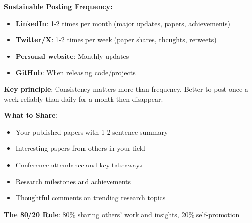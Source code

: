 \documentclass[11pt,a4paper]{article}
\begin{document}
\begin{tcolorbox}[colback=yellow!5,colframe=orange!60,title={\faClock~Realistic Update Schedule}]
\textbf{Sustainable Posting Frequency:}
\begin{itemize}[leftmargin=1.5em]
    \item \textbf{LinkedIn}: 1-2 times per month (major updates, papers, achievements)
    \item \textbf{Twitter/X}: 1-2 times per week (paper shares, thoughts, retweets)
    \item \textbf{Personal website}: Monthly updates
    \item \textbf{GitHub}: When releasing code/projects
\end{itemize}

\textbf{Key principle}: Consistency matters more than frequency. Better to post once a week reliably than daily for a month then disappear.
\end{tcolorbox}

\begin{tcolorbox}[colback=blue!5,colframe=blue!40,title={\faLightbulb~Content Strategy}]
\textbf{What to Share:}
\begin{itemize}[leftmargin=1.5em]
    \item Your published papers with 1-2 sentence summary
    \item Interesting papers from others in your field
    \item Conference attendance and key takeaways
    \item Research milestones and achievements
    \item Thoughtful comments on trending research topics
\end{itemize}

\textbf{The 80/20 Rule}: 80\% sharing others' work and insights, 20\% self-promotion
\end{tcolorbox}
\end{document}
